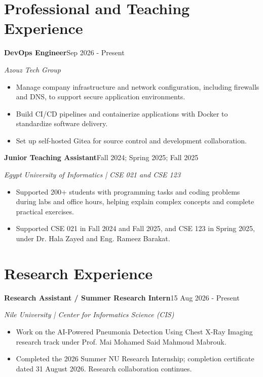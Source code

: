 \documentclass[10pt,a4paper]{article}
\newcommand{\cvitem}[3]{\par\addvspace{4pt}\textbf{#1}\hfill{\small #3}\par{\small\textit{#2}}\par}
\begin{document}
\section*{Professional and Teaching Experience}
\cvitem{DevOps Engineer}{Azouz Tech Group}{Sep 2026 - Present}
\begin{itemize}
\item Manage company infrastructure and network configuration, including firewalls and DNS, to support secure application environments.
\item Build CI/CD pipelines and containerize applications with Docker to standardize software delivery.
\item Set up self-hosted Gitea for source control and development collaboration.
\end{itemize}
\cvitem{Junior Teaching Assistant}{Egypt University of Informatics | CSE 021 and CSE 123}{Fall 2024; Spring 2025; Fall 2025}
\begin{itemize}
\item Supported 200+ students with programming tasks and coding problems during labs and office hours, helping explain complex concepts and complete practical exercises.
\item Supported CSE 021 in Fall 2024 and Fall 2025, and CSE 123 in Spring 2025, under Dr. Hala Zayed and Eng. Rameez Barakat.
\end{itemize}
\newpage
\section*{Research Experience}
\cvitem{Research Assistant / Summer Research Intern}{Nile University | Center for Informatics Science (CIS)}{15 Aug 2026 - Present}
\begin{itemize}
\item Work on the AI-Powered Pneumonia Detection Using Chest X-Ray Imaging research track under Prof. Mai Mohamed Said Mahmoud Mabrouk.
\item Completed the 2026 Summer NU Research Internship; completion certificate dated 31 August 2026. Research collaboration continues.
\end{itemize}
\end{document}
